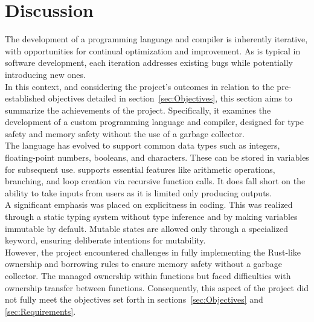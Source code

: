 \section{Discussion}
\label{sec:Discussion}

The development of a programming language and compiler is inherently iterative, with
opportunities for continual optimization and improvement. As is typical in software
development, each iteration addresses existing bugs while potentially introducing new
ones. \\

In this context, and considering the project's outcomes in relation to the
pre-established objectives detailed in section~\ref{sec:Objectives}, this section
aims to summarize the achievements of the project. Specifically, it examines the
development of a custom programming language and compiler, designed for type safety
and memory safety without the use of a garbage collector. \\

The \lang{} language has evolved to support common data types such as integers,
floating-point numbers, booleans, and characters. These can be stored in variables
for subsequent use. \lang{} supports essential features like arithmetic operations,
branching, and loop creation via recursive function calls. It does fall short on the
ability to take inputs from users as it is limited only producing outputs. \\

A significant emphasis was placed on explicitness in coding. This was realized
through a static typing system without type inference and by making variables
immutable by default. Mutable states are allowed only through a specialized keyword,
ensuring deliberate intentions for mutability. \\

However, the project encountered challenges in fully implementing the Rust-like
ownership and borrowing rules to ensure memory safety without a garbage collector.
The \borrowChecker{} managed ownership within functions but faced difficulties with
ownership transfer between functions. Consequently, this aspect of the project did
not fully meet the objectives set forth in sections~\ref{sec:Objectives} and
\ref{sec:Requirements}.

\newpage
